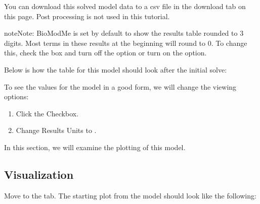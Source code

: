 \documentclass[letterpaper,10pt,english]{sphinxmanual}
\begin{document}
\sphinxAtStartPar
You can download this solved model data to a csv file in the
download tab on this page.  Post processing is not used in this tutorial.

\begin{figure}[htbp]
\centering

\noindent{}
\end{figure}

\begin{sphinxadmonition}{note}{Note:}
\sphinxAtStartPar
BioModMe is set by default to show the results table rounded to 3
digits. Most terms in these results at the beginning will round
to 0. To change this, check the  box and turn
off the  option or turn on the 
option.
\end{sphinxadmonition}

\sphinxAtStartPar
Below is how the table for this model should look after the initial solve:

\begin{figure}[htbp]
\centering

\noindent{}
\end{figure}

\sphinxAtStartPar
To see the values for the model in a good form, we will change the viewing
options:
\begin{enumerate}
%
\item {} 
\sphinxAtStartPar
Click the  Checkbox.

\item {} 
\sphinxAtStartPar
Change Results Units to .

\end{enumerate}

\begin{figure}[htbp]
\centering

\noindent{}
\end{figure}

\sphinxAtStartPar
In this section, we will examine the plotting of this model.


\subsection{Visualization}
\label{\detokenize{pages/tutorial_mc/2_model_results:visualization}}
\sphinxAtStartPar
Move to the  tab.  The starting plot from the model should
look like the following:
\end{document}
